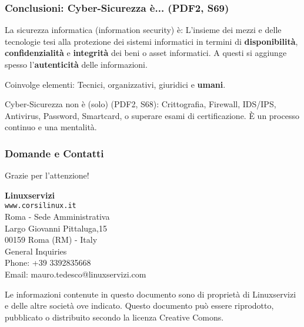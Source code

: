 \documentclass{beamer}
\begin{document}
\begin{frame}
  \frametitle{Conclusioni: Cyber-Sicurezza è... (PDF2, S69)}
  \begin{block}{La sicurezza informatica (information security) è:}
  L'insieme dei mezzi e delle tecnologie tesi alla protezione dei sistemi informatici in termini di \textbf{disponibilità}, \textbf{confidenzialità} e \textbf{integrità} dei beni o asset informatici.
  A questi si aggiunge spesso l'\textbf{autenticità} delle informazioni.
  \end{block}
  \pause
  \begin{block}{Coinvolge elementi:}
  Tecnici, organizzativi, giuridici e \textbf{umani}.
  \end{block}
  \pause
  \begin{alertblock}{Cyber-Sicurezza non è (solo) (PDF2, S68):}
  Crittografia, Firewall, IDS/IPS, Antivirus, Password, Smartcard, o superare esami di certificazione. È un processo continuo e una mentalità.
  \end{alertblock}
\end{frame}


\begin{frame}
  \frametitle{Domande e Contatti}
  \centering
  \Large Grazie per l'attenzione!
  \vspace{2em}

  \textbf{Linuxservizi } \\
  \texttt{www.corsilinux.it} \\
  \vspace{1em}
  \small
 Roma - Sede Amministrativa \\
  Largo Giovanni Pittaluga,15  \\
  00159 Roma (RM) - Italy \\
  \vspace{0.5em}
  General Inquiries \\
  Phone: +39 3392835668 \\
  Email: mauro.tedesco@linuxservizi.com
  
  \vspace{2em}
  \tiny{Le informazioni contenute in questo documento sono di proprietà di Linuxservizi e delle altre società ove indicato. 
  Questo documento può essere riprodotto, pubblicato o distribuito secondo la licenza Creative Comons.}
\end{frame}
\end{document}

